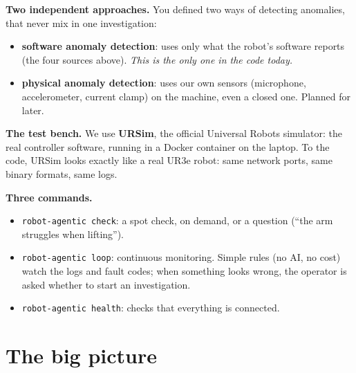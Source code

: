 \documentclass[10pt]{article}
\newcommand{\brkus}{\textunderscore\allowbreak}
\newcommand{\f}[1]{\texttt{\let\_\brkus #1}}
\begin{document}
\textbf{Two independent approaches.} You defined two ways of detecting anomalies, that never
mix in one investigation:
\begin{itemize}
\item \textbf{software anomaly detection}: uses only what the robot's software reports (the four sources above). \emph{This is the only one in the code today.}
\item \textbf{physical anomaly detection}: uses our own sensors (microphone, accelerometer, current clamp) on the machine, even a closed one. Planned for later.
\end{itemize}

\textbf{The test bench.} We use \textbf{URSim}, the official Universal Robots simulator: the real
controller software, running in a Docker container on the laptop. To the code, URSim looks
exactly like a real UR3e robot: same network ports, same binary formats, same logs.

\textbf{Three commands.}
\begin{itemize}
\item \f{robot-agentic check}: a spot check, on demand, or a question (``the arm struggles when lifting'').
\item \f{robot-agentic loop}: continuous monitoring. Simple rules (no AI, no cost) watch the logs and fault codes; when something looks wrong, the operator is asked whether to start an investigation.
\item \f{robot-agentic health}: checks that everything is connected.
\end{itemize}

\section{The big picture}
\end{document}
